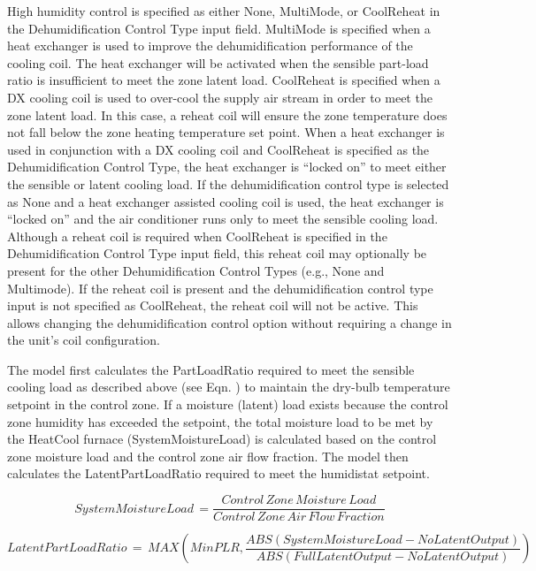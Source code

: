 High humidity control is specified as either None, MultiMode, or CoolReheat in the Dehumidification Control Type input field. MultiMode is specified when a heat exchanger is used to improve the dehumidification performance of the cooling coil. The heat exchanger will be activated when the sensible part-load ratio is insufficient to meet the zone latent load. CoolReheat is specified when a DX cooling coil is used to over-cool the supply air stream in order to meet the zone latent load. In this case, a reheat coil will ensure the zone temperature does not fall below the zone heating temperature set point. When a heat exchanger is used in conjunction with a DX cooling coil and CoolReheat is specified as the Dehumidification Control Type, the heat exchanger is ``locked on'' to meet either the sensible or latent cooling load. If the dehumidification control type is selected as None and a heat exchanger assisted cooling coil is used, the heat exchanger is ``locked on'' and the air conditioner runs only to meet the sensible cooling load. Although a reheat coil is required when CoolReheat is specified in the Dehumidification Control Type input field, this reheat coil may optionally be present for the other Dehumidification Control Types (e.g., None and Multimode). If the reheat coil is present and the dehumidification control type input is not specified as CoolReheat, the reheat coil will not be active. This allows changing the dehumidification control option without requiring a change in the unit's coil configuration.

The model first calculates the PartLoadRatio required to meet the sensible cooling load as described above (see Eqn. ) to maintain the dry-bulb temperature setpoint in the control zone. If a moisture (latent) load exists because the control zone humidity has exceeded the setpoint, the total moisture load to be met by the HeatCool furnace (SystemMoistureLoad) is calculated based on the control zone moisture load and the control zone air flow fraction. The model then calculates the LatentPartLoadRatio required to meet the humidistat setpoint.

\begin{equation}
SystemMoistureLoad\, = \frac{{Control\,Zone\,Moisture\,Load}}{{Control\,Zone\,Air\,Flow\,Fraction}}
\end{equation}

\begin{equation}
LatentPartLoadRatio\, = \,MAX\left( {MinPLR,\frac{{ABS\left( {SystemMoistureLoad - NoLatentOutput} \right)}}{{ABS\left( {FullLatentOutput - NoLatentOutput} \right)}}} \right)
\end{equation}

